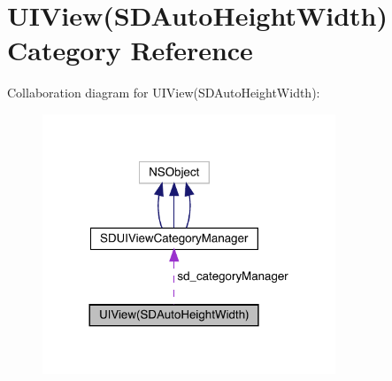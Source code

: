 \hypertarget{category_u_i_view_07_s_d_auto_height_width_08}{}\section{U\+I\+View(S\+D\+Auto\+Height\+Width) Category Reference}
\label{category_u_i_view_07_s_d_auto_height_width_08}


Collaboration diagram for U\+I\+View(S\+D\+Auto\+Height\+Width)\+:\nopagebreak
\begin{figure}[H]
\begin{center}
\leavevmode
\includegraphics[width=248pt]{category_u_i_view_07_s_d_auto_height_width_08__coll__graph}
\end{center}
\end{figure}
